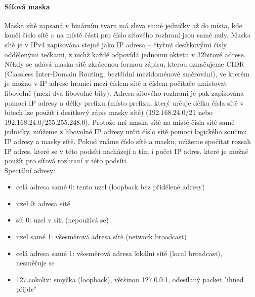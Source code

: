 \documentclass[10pt,a4paper]{article}
\begin{document}
\paragraph{Síťová maska} Maska sítě zapsaná v binárním tvaru má zleva samé jedničky až do místa, kde končí číslo sítě a na místě části pro číslo síťového rozhraní jsou samé nuly. Maska sítě je v IPv4 zapisována stejně jako IP adresa – čtyřmi desítkovými čísly oddělenými tečkami, z nichž každé odpovídá jednomu oktetu v 32bitové adrese. Někdy se udává maska sítě zkrácenou formou zápisu, kterou označujeme CIDR (Classless Inter-Domain Routing, beztřídní mezidoménové směrování), ve kterém je možno v IP adrese hranici mezi číslem sítě a číslem počítače umisťovat libovolně (mezi dva libovolné bity). Adresa síťového rozhraní je pak zapisována pomocí IP adresy a délky prefixu (místo prefixu, který určuje délku čísla sítě v bitech lze použít i desítkový zápis masky sítě) (192.168.24.0/21 nebo 192.168.24.0/255.255.248.0). Protože má maska sítě na místě čísla sítě samé jedničky, můžeme z libovolné IP adresy určit číslo sítě pomocí logického součinu IP adresy a masky sítě. Pokud známe číslo sítě a masku, můžeme spočítat rozsah IP adres, které se v této podsíti nacházejí a tím i počet IP adres, které je možné použít pro síťová rozhraní v této podsíti. \\
Speciální adresy:
\begin{itemize}
	\item celá adresa samé 0: tento uzel (loopback bez přidělené adresy)
	\item uzel 0: adresa sítě
	\item síť 0: uzel v síti (nepoužívá se)
	\item uzel samé 1: všesměrová adresa sítě (network broadcast)
	\item celá adresa samé 1: všesměrová adresa lokální sítě (local broadcast), nesměřuje se
	\item 127.cokoliv: smyčka (loopback), většinou 127.0.0.1, odesílaný packet "ihned přijde"
\end{itemize}
\end{document}
